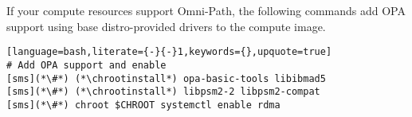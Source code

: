 If your compute resources support Omni-Path, the following commands add OPA
support using base distro-provided drivers to the compute image. 

\begin{lstlisting}[language=bash,literate={-}{-}1,keywords={},upquote=true]
# Add OPA support and enable
[sms](*\#*) (*\chrootinstall*) opa-basic-tools libibmad5
[sms](*\#*) (*\chrootinstall*) libpsm2-2 libpsm2-compat
[sms](*\#*) chroot $CHROOT systemctl enable rdma
\end{lstlisting}
